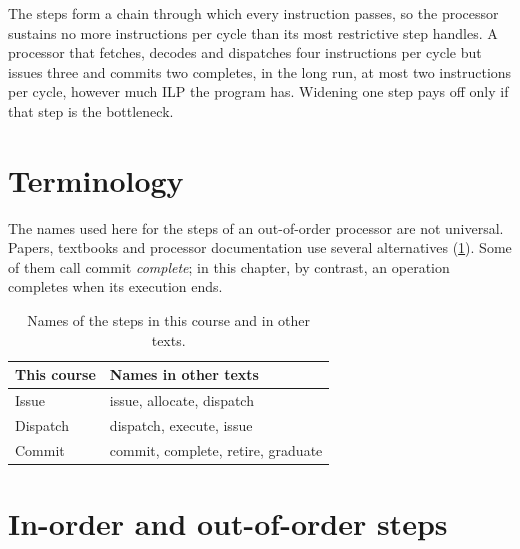 \documentclass[../main.tex]{subfiles}
\begin{document}
The steps form a chain through which every instruction passes, so the
processor sustains no more instructions per cycle than its most restrictive
step handles.  A processor that fetches, decodes and dispatches four
instructions per cycle but issues three and commits two completes, in the
long run, at most two instructions per cycle, however much ILP the program
has.  Widening one step pays off only if that step is the bottleneck.

\section{Terminology}
\label{sec:l08-terminology}

The names used here for the steps of an out-of-order processor are
not universal.  Papers, textbooks
and processor documentation use several alternatives
(\cref{tab:l08-terminology}).  Some of them call commit
\emph{complete}; in this chapter, by contrast, an operation completes when its
execution ends.

\begin{table}[htbp]
  \centering\small
  \caption{Names of the steps in this course and in other texts.}
  \label{tab:l08-terminology}
  \begin{tabular}{@{}ll@{}}
    \toprule
    This course & Names in other texts \\
    \midrule
    Issue & issue, allocate, dispatch \\
    Dispatch & dispatch, execute, issue \\
    Commit & commit, complete, retire, graduate \\
    \bottomrule
  \end{tabular}
\end{table}

\section{In-order and out-of-order steps}
\label{sec:l08-order}
\end{document}
